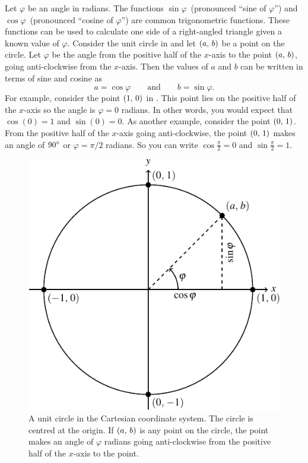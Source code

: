 \documentclass[a4paper,oneside,12pt]{article}
\begin{document}
Let $\varphi$ be an angle in radians.  The functions
$\sin\varphi$~(pronounced ``sine of $\varphi$'') and
$\cos\varphi$~(pronounced ``cosine of $\varphi$'') are common
trigonometric functions.  These functions can be used to calculate one
side of a right-angled triangle given a known value of $\varphi$.
Consider the unit circle in  and let
$\left\lparen{a},\, {b}\right\rparen$ be a point on the circle.  Let $\varphi$ be the angle
from the positive half of the $x$-axis to the point $\left\lparen{a},\, {b}\right\rparen$,
going anti-clockwise from the $x$-axis.  Then the values of $a$ and
$b$ can be written in terms of sine and cosine as
\[
a = \cos\varphi
\qquad\text{and}\qquad
b = \sin\varphi.
\]
For example, consider the point $\left\lparen{1},\, {0}\right\rparen$ in
.  This point lies on the positive
half of the $x$-axis so the angle is $\varphi = 0$ radians.  In other
words, you would expect that $\cos(0) = 1$ and $\sin(0) = 0$.  As
another example, consider the point $\left\lparen{0},\, {1}\right\rparen$.  From the positive
half of the $x$-axis going anti-clockwise, the point $\left\lparen{0},\, {1}\right\rparen$
makes an angle of ${90}^{\circ}$ or $\varphi = \pi / 2$ radians.  So
you can write $\cos\frac{\pi}{2} = 0$ and $\sin\frac{\pi}{2} = 1$.

\begin{figure}[!htbp]
\centering
\includegraphics[scale=1.1]{image/04/unit-circle.pdf}
\caption{%
  A unit circle in the Cartesian coordinate system.  The circle is
  centred at the origin.  If $\left\lparen{a},\, {b}\right\rparen$ is any point on the
  circle, the point makes an angle of $\varphi$ radians going
  anti-clockwise from the positive half of the $x$-axis to the point.
}
\label{fig:point_on_unit_circle}
\end{figure}
\end{document}
